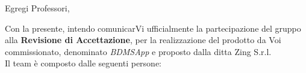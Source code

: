 \documentclass[10pt,a4paper,sans]{moderncv}        %
\begin{document}
\date{\emph{2015-06-17}}
\opening{Egregi Professori,}
\makelettertitle

Con la presente, intendo comunicarVi ufficialmente la partecipazione del gruppo \groupName{} alla \textbf{Revisione di Accettazione}, per la realizzazione del prodotto da Voi commissionato, denominato \textit{BDMSApp} e proposto dalla ditta Zing S.r.l.\\
Il team è composto dalle seguenti persone:
\end{document}
